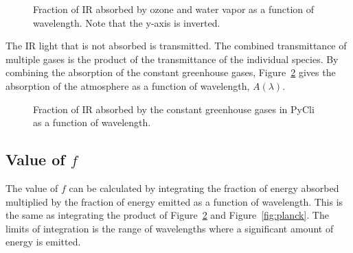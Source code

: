 \documentclass[12pt]{article} %
\begin{document}
\begin{figure}[H]
	\caption{Fraction of IR absorbed by ozone and water vapor as a function of wavelength. Note that the y-axis is inverted.}
	\label{fig:absorb}
\end{figure}

The IR light that is not absorbed is transmitted. The combined transmittance of multiple gases is the product of the transmittance of the individual species. By combining the absorption of the constant greenhouse gases, Figure~\ref{fig:combine_absorb} gives the absorption of the atmosphere as a function of wavelength, $A(\lambda)$.

\begin{figure}[H]
	\caption{Fraction of IR absorbed by the constant greenhouse gases in PyCli as a function of wavelength.}
	\label{fig:combine_absorb}
\end{figure}

\subsection{Value of $f$}
The value of $f$ can be calculated by integrating the fraction of energy absorbed multiplied by the fraction of energy emitted as a function of wavelength. This is the same as integrating the product of Figure~\ref{fig:combine_absorb} and Figure~\ref{fig:planck}. The limits of integration is the range of wavelengths where a significant amount of energy is emitted. 
\end{document}
